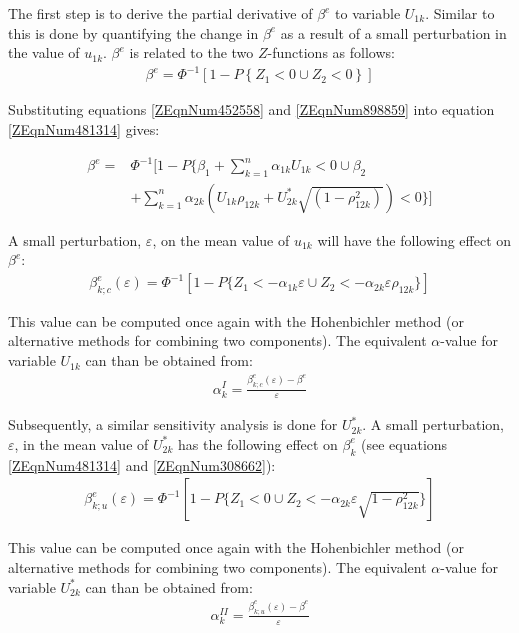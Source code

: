 The first step is to derive the partial derivative of $\beta^e$ to variable $U_{1k}$. Similar to  this is done by quantifying the change in $\beta^e$ as a result of a small perturbation in the value of $u_{1k}$. $\beta^e$ is related to the two $Z$-functions as follows:
\begin{align}
\beta ^{e} =\Phi ^{-1} \left[1-P\left\{Z_{1} <0\cup Z_{2} <0\right\}\right]\label{ZEqnNum481314} 
\end{align}

Substituting equations \eqref{ZEqnNum452558} and \eqref{ZEqnNum898859} into equation \eqref{ZEqnNum481314} gives:
{\begin{align}
\beta ^{e} =&\Phi ^{-1} [1-P\{\beta _{1} +\sum _{k=1}^{n}\alpha _{1k} U_{1k}  <0\cup \beta _{2} \label{ZEqnNum308662}\\\nonumber&+\sum _{k=1}^{n}\alpha _{2k} \left(U_{1k} \rho _{12k} +U_{2k}^{*} \sqrt{(1-\rho _{12k}^{2} )} \right) <0\}]  
\end{align}

A small perturbation, $\varepsilon$, on the mean value of $u_{1k}$ will have the following effect on $\beta^e$: 
\begin{align}
\beta _{k;c} ^{e} (\varepsilon )=\Phi ^{-1} [1-P\{ Z_{1} <-\alpha _{1k} \varepsilon \cup Z_{2} <-\alpha _{2k} \varepsilon \rho _{12k} \} ] \label{ZEqnNum346117} 
\end{align}

This value can be computed once again with the Hohenbichler method (or alternative methods for combining two components). The equivalent $\alpha$-value for variable $U_{1k}$ can than be obtained from:
\begin{align}
\alpha _{k}^{I} =\frac{\beta _{k;c} ^{e} (\varepsilon )-\beta ^{e} }{\varepsilon } \label{0.118)} 
\end{align}

Subsequently, a similar sensitivity analysis is done for $U_{2k}^{*}$. A small perturbation, $\varepsilon$, in the mean value of $U_{2k}^{*}$ has the following effect on $\beta_k^e$ (see equations \eqref{ZEqnNum481314} and \eqref{ZEqnNum308662}):
\begin{align}
\beta _{k;u} ^{e} (\varepsilon )=\Phi ^{-1} [1-P\{ Z_{1} <0   \cup    Z_{2} <-\alpha _{2k} \varepsilon \sqrt{1-\rho _{12k}^{2} } \} ]\label{ZEqnNum705847} 
\end{align}

This value can be computed once again with the Hohenbichler method (or alternative methods for combining two components). The equivalent $\alpha$-value for variable $U_{2k}^{*}$ can than be obtained from:
\begin{align}
\alpha _{k}^{II} =\frac{\beta _{k;u} ^{e} (\varepsilon )-\beta ^{e} }{\varepsilon } \label{0.120)} 
\end{align}

}

